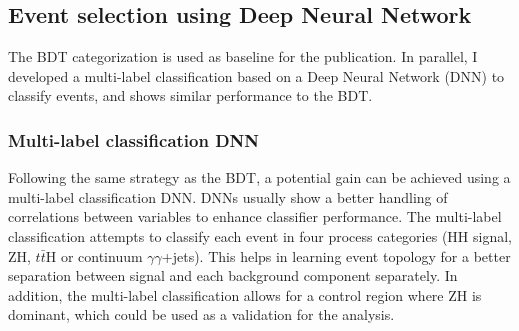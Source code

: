 \subsection{Event selection using Deep Neural Network}
\label{HHyybb:ObjEvt:DNN}

The BDT categorization is used as baseline for the publication. In parallel, I developed a multi-label classification based on a Deep Neural Network (DNN) to classify events, and shows similar performance to the BDT. 
\subsubsection{Multi-label classification DNN}
Following the same strategy as the BDT, a potential gain can be achieved using a multi-label classification DNN. DNNs usually show a better handling of correlations between variables to enhance classifier performance. The multi-label classification attempts to classify each event in four process categories (HH signal, ZH, $t\bar{t}$H or continuum $\gamma\gamma$+jets). This helps in learning event topology for a better separation between signal and each background component separately. In addition, the multi-label classification allows for a control region where ZH is dominant, which could be used as a validation for the \HHyybb analysis. \\

